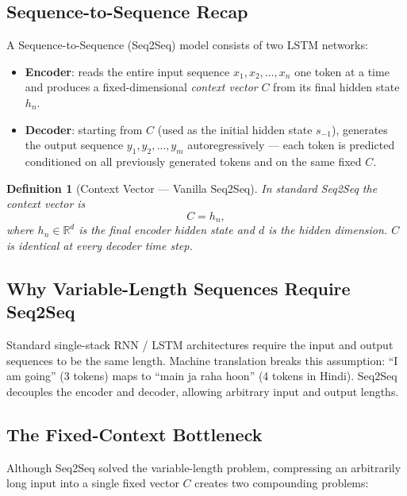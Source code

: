 \documentclass[12pt,a4paper]{article}
\newtheorem{definition}{Definition}[section]
\begin{document}
\subsection{Sequence-to-Sequence Recap}

A Sequence-to-Sequence (Seq2Seq) model \cite{sutskever2014} consists
of two LSTM networks:

\begin{itemize}
  \item \textbf{Encoder}: reads the entire input sequence
        $x_1, x_2, \ldots, x_n$ one token at a time and produces a
        fixed-dimensional \emph{context vector} $C$ from its final
        hidden state $h_n$.
  \item \textbf{Decoder}: starting from $C$ (used as the initial
        hidden state $s_{-1}$), generates the output sequence
        $y_1, y_2, \ldots, y_m$ autoregressively --- each token is
        predicted conditioned on all previously generated tokens and
        on the same fixed $C$.
\end{itemize}

\begin{definition}[Context Vector --- Vanilla Seq2Seq]
\label{def:ctx-vanilla}
In standard Seq2Seq the context vector is
\begin{equation}
  C = h_n,
  \label{eq:ctx-vanilla}
\end{equation}
where $h_n \in \mathbb{R}^{d}$ is the final encoder hidden state
and $d$ is the hidden dimension.  $C$ is \emph{identical} at every
decoder time step.
\end{definition}

\subsection{Why Variable-Length Sequences Require Seq2Seq}

Standard single-stack RNN / LSTM architectures require the input and
output sequences to be the same length.  Machine translation breaks
this assumption: ``I am going'' (3 tokens) maps to
``\foreignlanguage{hindi}{main ja raha hoon}'' (4 tokens in Hindi).
Seq2Seq decouples the encoder and decoder, allowing arbitrary input
and output lengths.

\subsection{The Fixed-Context Bottleneck}

Although Seq2Seq solved the variable-length problem, compressing an
arbitrarily long input into a single fixed vector $C$ creates two
compounding problems:
\end{document}
